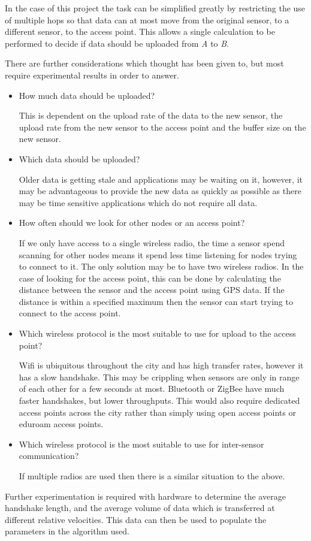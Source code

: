 In the case of this project the task can be simplified greatly by restricting the use of multiple hops so that data can at most move from the original sensor, to a different sensor, to the access point. This allows a single calculation to be performed to decide if data should be uploaded from \emph{A} to \emph{B}. 

There are further considerations which thought has been given to, but most require experimental results in order to answer. 

\begin{itemize}
	\item How much data should be uploaded?

		This is dependent on the upload rate of the data to the new sensor, the upload rate from the new sensor to the access point and the buffer size on the new sensor. 

	\item Which data should be uploaded?

		Older data is getting stale and applications may be waiting on it, however, it may be advantageous to provide the new data as quickly as possible as there may be time sensitive applications which do not require all data. 

	\item How often should we look for other nodes or an access point?

		If we only have access to a single wireless radio, the time a sensor spend scanning for other nodes means it spend less time listening for nodes trying to connect to it. The only solution may be to have two wireless radios. In the case of looking for the access point, this can be done by calculating the distance between the sensor and the access point using GPS data. If the distance is within a specified maximum then the sensor can start trying to connect to the access point. 

	\item Which wireless protocol is the most suitable to use for upload to the access point?

		Wifi is ubiquitous throughout the city and has high transfer rates, however it has a slow handshake. This may be crippling when sensors are only in range of each other for a few seconds at most. Bluetooth or ZigBee have much faster handshakes, but lower throughputs. This would also require dedicated access points across the city rather than simply using open access points or eduroam access points.

	\item Which wireless protocol is the most suitable to use for inter-sensor communication?

		If multiple radios are used then there is a similar situation to the above. 

\end{itemize}


Further experimentation is required with hardware to determine the average handshake length, and the average volume of data which is transferred at different relative velocities. This data can then be used to populate the parameters in the algorithm used. 




